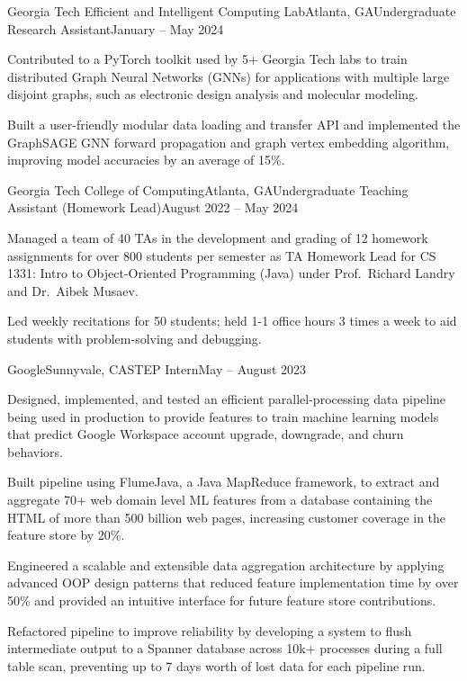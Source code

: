 \documentclass{article}
\begin{document}
\begin{flushleft}
    \begin{experience}{Georgia Tech Efficient and Intelligent Computing Lab}{Atlanta, GA}{Undergraduate Research Assistant}{January -- May 2024}
        \item Contributed to a PyTorch toolkit used by 5+ Georgia Tech labs to train distributed Graph Neural Networks (GNNs) for applications with multiple large disjoint graphs, such as electronic design analysis and molecular modeling.
        \item Built a user-friendly modular data loading and transfer API and implemented the GraphSAGE GNN forward propagation and graph vertex embedding algorithm, improving model accuracies by an average of 15\%.
    \end{experience}

    \begin{experience}{Georgia Tech College of Computing}{Atlanta, GA}{Undergraduate Teaching Assistant (Homework Lead)}{August 2022 -- May 2024}
        \item Managed a team of 40 TAs in the development and grading of 12 homework assignments for over 800 students per semester as TA Homework Lead for CS 1331: Intro to Object-Oriented Programming (Java) under Prof.~Richard Landry and Dr.~Aibek Musaev.
        \item Led weekly recitations for 50 students; held 1-1 office hours 3 times a week to aid students with problem-solving and debugging.
    \end{experience}

    \begin{experience}{Google}{Sunnyvale, CA}{STEP Intern}{May -- August 2023}
        \item Designed, implemented, and tested an efficient parallel-processing data pipeline being used in production to provide features to train machine learning models that predict Google Workspace account upgrade, downgrade, and churn behaviors.
        \item Built pipeline using FlumeJava, a Java MapReduce framework, to extract and aggregate 70+ web domain level ML features from a database containing the HTML of more than 500 billion web pages, increasing customer coverage in the feature store by 20\%.
        \item Engineered a scalable and extensible data aggregation architecture by applying advanced OOP design patterns that reduced feature implementation time by over 50\% and provided an intuitive interface for future feature store contributions.
        \item Refactored pipeline to improve reliability by developing a system to flush intermediate output to a Spanner database across 10k+ processes during a full table scan, preventing up to 7 days worth of lost data for each pipeline run.
    \end{experience}


\end{flushleft}
\end{document}
